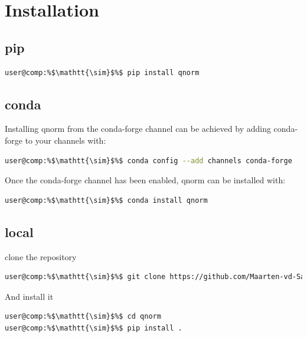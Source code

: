 \section{Installation}

\subsection{pip}

\begin{lstlisting}[escapechar=\%,language=bash,basicstyle=\ttfamily\color{white}]
user@comp:%$\mathtt{\sim}$%$ pip install qnorm
\end{lstlisting}

\subsection{conda}

Installing qnorm from the conda-forge channel can be achieved by adding conda-forge to your channels with:

\begin{lstlisting}[escapechar=\%,language=bash,basicstyle=\ttfamily\color{white}]
user@comp:%$\mathtt{\sim}$%$ conda config --add channels conda-forge
\end{lstlisting}

Once the conda-forge channel has been enabled, qnorm can be installed with:

\begin{lstlisting}[escapechar=\%,language=bash,basicstyle=\ttfamily\color{white}]
user@comp:%$\mathtt{\sim}$%$ conda install qnorm
\end{lstlisting}

\subsection{local}

clone the repository

\begin{lstlisting}[escapechar=\%,language=bash,basicstyle=\ttfamily\color{white}]
user@comp:%$\mathtt{\sim}$%$ git clone https://github.com/Maarten-vd-Sande/qnorm
\end{lstlisting}

And install it

\begin{mdframed}[
    backgroundcolor=bash_backcolor,
    hidealllines=true,
    innertopmargin=0pt,
    innerbottommargin=0pt,
    innerleftmargin=0pt,
    innerrightmargin=0pt
]
\begin{lstlisting}[language=bash,basicstyle=\ttfamily\color{white}]
user@comp:%$\mathtt{\sim}$%$ cd qnorm
user@comp:%$\mathtt{\sim}$%$ pip install .
\end{lstlisting}
\end{mdframed}
